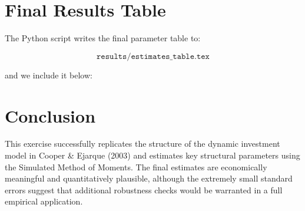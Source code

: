 \documentclass[letterpaper,12pt]{article}
\theoremstyle{definition}
\begin{document}
	\section{Final Results Table}
	
	The Python script writes the final parameter table to:
	
	\[
	\texttt{results/estimates\_table.tex}
	\]
	
	and we include it below:
	
	\begin{center}
		
	\end{center}
	
	\section{Conclusion}
	
	This exercise successfully replicates the structure of the dynamic investment 
	model in Cooper \& Ejarque (2003) and estimates key structural parameters 
	using the Simulated Method of Moments.  
	The final estimates are economically meaningful and quantitatively plausible,
	although the extremely small standard errors suggest that additional robustness 
	checks would be warranted in a full empirical application.
	
\end{document}
